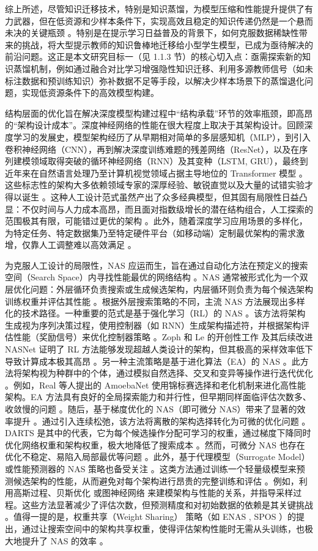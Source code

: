\documentclass[../main.tex]{subfiles}
\begin{document}
综上所述，尽管知识迁移技术，特别是知识蒸馏，为模型压缩和性能提升提供了有力武器，但在低资源和少样本条件下，实现高效且稳定的知识传递仍然是一个悬而未决的关键瓶颈 。特别是在提示学习日益普及的背景下，如何克服数据稀缺性带来的挑战，将大型提示教师的知识鲁棒地迁移给小型学生模型，已成为亟待解决的前沿问题。这正是本文研究目标一（见 1.1.3 节）的核心切入点：亟需探索新的知识蒸馏机制，例如通过融合对比学习增强隐性知识迁移、利用多源教师信号（如未标注数据和预训练知识）弥补数据不足等手段，以解决少样本场景下的蒸馏退化问题，实现低资源条件下的高效模型构建。


结构层面的优化旨在解决深度模型构建过程中“结构承载”环节的效率瓶颈，即高昂的“架构设计成本”。深度神经网络的性能在很大程度上取决于其架构设计。回顾深度学习的发展史，模型架构经历了从早期相对简单的多层感知机（MLP），到引入卷积神经网络（CNN），再到解决深度训练难题的残差网络（ResNet），以及在序列建模领域取得突破的循环神经网络（RNN）及其变种（LSTM, GRU），最终到近年来在自然语言处理乃至计算机视觉领域占据主导地位的 Transformer 模型 。这些标志性的架构大多依赖领域专家的深厚经验、敏锐直觉以及大量的试错实验才得以诞生 。这种人工设计范式虽然产出了众多经典模型，但其固有局限性日益凸显：不仅时间与人力成本高昂，而且面对指数级增长的潜在结构组合，人工探索的范围极其有限，可能错过更优的架构 。此外，随着深度学习应用场景的多样化，为特定任务、特定数据集乃至特定硬件平台（如移动端）定制最优架构的需求激增，仅靠人工调整难以高效满足 。

为克服人工设计的局限性，NAS 应运而生，旨在通过自动化方法在预定义的搜索空间（Search Space）内寻找性能最优的网络结构 。NAS 通常被形式化为一个双层优化问题：外层循环负责搜索或生成候选架构，内层循环则负责为每个候选架构训练权重并评估其性能 。根据外层搜索策略的不同，主流 NAS 方法展现出多样化的技术路径。一种重要的范式是基于强化学习（RL）的 NAS 。该方法将架构生成视为序列决策过程，使用控制器（如 RNN）生成架构描述符，并根据架构评估性能（奖励信号）来优化控制器策略 。Zoph 和 Le 的开创性工作 及其后续改进 NASNet 证明了 RL 方法能够发现超越人类设计的架构，但其极高的采样效率低下导致计算成本极其高昂 。另一种主流策略是基于进化算法（EA）的 NAS 。此方法将架构视为种群中的个体，通过模拟自然选择、交叉和变异等操作进行迭代优化 。例如，Real 等人提出的 AmoebaNet 使用锦标赛选择和老化机制来进化高性能架构。EA 方法具有良好的全局探索能力和并行性，但早期同样面临评估次数多、收敛慢的问题 。随后，基于梯度优化的 NAS（即可微分 NAS）带来了显著的效率提升 。通过引入连续松弛，该方法将离散的架构选择转化为可微的优化问题 。DARTS 是其中的代表，它为每个候选操作分配可学习的权重，通过梯度下降同时优化网络权重和架构权重，极大地降低了搜索成本 。然而，可微分 NAS 也存在优化不稳定、易陷入局部最优等问题 。此外，基于代理模型（Surrogate Model）或性能预测器的 NAS 策略也备受关注 。这类方法通过训练一个轻量级模型来预测候选架构的性能，从而避免对每个架构进行昂贵的完整训练和评估 。例如，利用高斯过程、贝斯优化 或图神经网络 来建模架构与性能的关系，并指导采样过程。这些方法显著减少了评估次数，但预测精度和对初始数据的依赖是其关键挑战 。值得一提的是，权重共享（Weight Sharing） 策略（如 ENAS , SPOS ）的提出，通过让搜索空间中的架构共享权重，使得评估架构性能时无需从头训练，也极大地提升了 NAS 的效率 。
\end{document}
